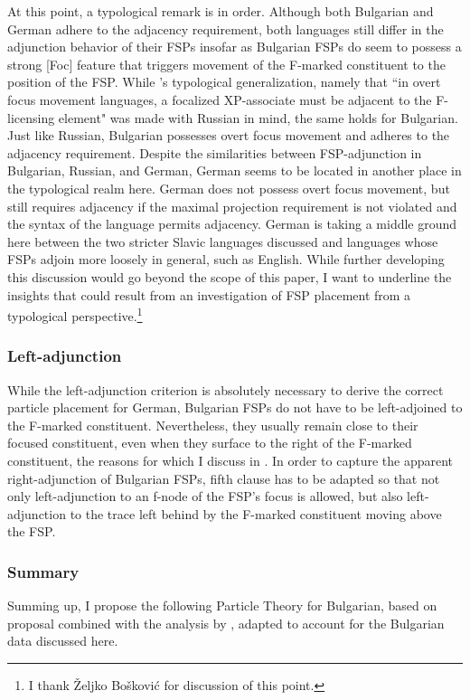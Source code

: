 \documentclass[output=paper,colorlinks,citecolor=brown]{langscibook}
\begin{document}
\noindent At this point, a typological remark is in order. Although both Bulgarian and German adhere to the adjacency requirement, both languages still differ in the adjunction behavior of their FSPs insofar as Bulgarian FSPs do seem to possess a strong [Foc] feature that triggers movement of the F-marked constituent to the position of the FSP. While \citet[428] {Zanon2018}'s typological generalization, namely that ``in overt focus movement languages, a focalized XP-associate must be adjacent to the F-licensing element" was made with Russian in mind, the same holds for Bulgarian. Just like Russian, Bulgarian possesses overt focus movement and adheres to the adjacency requirement. Despite the similarities between FSP-adjunction in Bulgarian, Russian, and German, German seems to be located in another place in the typological realm here. German does not possess overt focus movement, but still requires adjacency if the maximal projection requirement is not violated and the syntax of the language permits adjacency. German is taking a middle ground here between the two stricter Slavic languages discussed and languages whose FSPs adjoin more loosely in general, such as English. While further developing this discussion would go beyond the scope of this paper, I want to underline the insights that could result from an investigation of FSP placement from a typological perspective.\footnote{I thank \v{Z}eljko Bo\v{s}kovi\'{c} for discussion of this point.}
\subsubsection{Left-adjunction}\label{sec:3.3.5}
While the left-adjunction criterion is absolutely necessary to derive the correct particle placement for German, Bulgarian FSPs do not have to be left-adjoined to the F-marked constituent. Nevertheless, they usually remain close to their focused constituent, even when they surface to the right of the F-marked constituent, the reasons for which I discuss in . In order to capture the apparent right-adjunction of Bulgarian FSPs,  fifth clause has to be adapted so that not only left-adjunction to an f-node of the FSP's focus is allowed, but also left-adjunction to the trace left behind by the F-marked constituent moving above the FSP. 
\subsubsection{Summary}\label{sec:3.3.6}
Summing up, I propose the following Particle Theory for Bulgarian, based on  proposal combined with the analysis by \citet{Zanon2018}, adapted to account for the Bulgarian data discussed here. 
\end{document}
